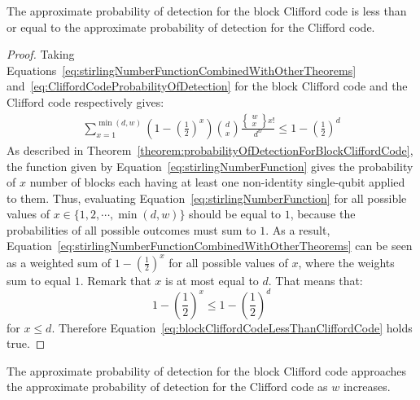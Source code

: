 \begin{theorem}
The approximate probability of detection for the block Clifford code is less than or equal to the approximate probability of detection for the Clifford code.
\end{theorem}
\begin{proof}
Taking Equations~\eqref{eq:stirlingNumberFunctionCombinedWithOtherTheorems} and~\eqref{eq:CliffordCodeProbabilityOfDetection} for the block Clifford code and the Clifford code respectively gives:
\begin{align}
\label{eq:blockCliffordCodeLessThanCliffordCode}
\sum_{x=1} ^{\min(d,w)} \left(1-\left(\frac{1}{2}\right)^{x}\right) {d \choose x} \frac{\left\{\begin{smallmatrix}w\\x\end{smallmatrix}\right\}x!}{d^w} \leq 1-\left(\frac{1}{2}\right)^{d}
\end{align}
As described in Theorem~\ref{theorem:probabilityOfDetectionForBlockCliffordCode}, the function given by Equation~\eqref{eq:stirlingNumberFunction} gives the probability of $x$ number of blocks each having at least one non-identity single-qubit applied to them. Thus, evaluating Equation~\eqref{eq:stirlingNumberFunction} for all possible values of $x \in \{1,2, \cdots , \min (d,w)\}$ should be equal to $1$, because the probabilities of all possible outcomes must sum to $1$. As a result, Equation~\eqref{eq:stirlingNumberFunctionCombinedWithOtherTheorems} can be seen as a weighted sum of $1 - \left(\frac{1}{2}\right)^x$ for all possible values of $x$, where the weights sum to equal $1$. Remark that $x$ is at most equal to $d$. That means that:
$$1 - \left(\frac{1}{2}\right)^x \leq 1 - \left(\frac{1}{2}\right)^d$$ for $x \leq d$. Therefore Equation~\eqref{eq:blockCliffordCodeLessThanCliffordCode} holds true.
\end{proof}
\begin{theorem}
The approximate probability of detection for the block Clifford code approaches the approximate probability of detection for the Clifford code as $w$ increases.
\end{theorem}
